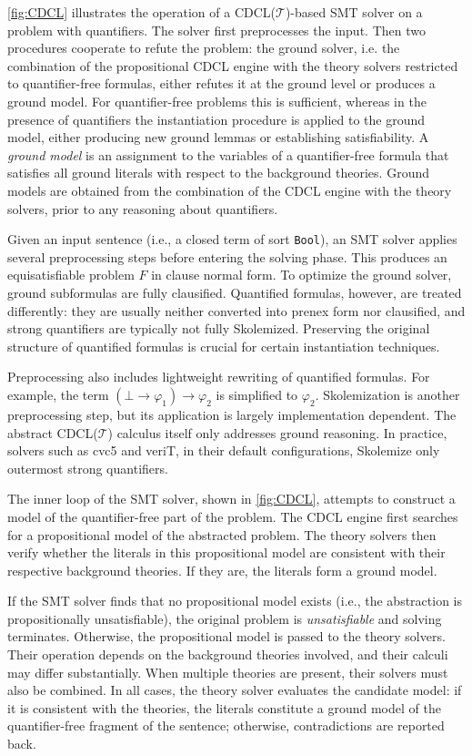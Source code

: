 \cref{fig:CDCL} illustrates the operation of a CDCL($\mathcal{T}$)-based SMT solver on a problem with quantifiers.
The solver first preprocesses the input.
Then two procedures cooperate to refute the problem: the ground solver, i.e. the combination of the propositional CDCL engine with the theory solvers restricted to quantifier-free formulas, either refutes it at the ground level or produces a ground model.
For quantifier-free problems this is sufficient, whereas in the presence of quantifiers the instantiation procedure is applied to the ground model, either producing new ground lemmas or establishing satisfiability.
A \emph{ground model} is an assignment to the variables of a quantifier-free formula that satisfies all ground literals with respect to the background theories.
Ground models are obtained from the combination of the CDCL engine with the theory solvers, prior to any reasoning about quantifiers.

Given an input sentence (i.e., a closed term of sort \texttt{Bool}), an SMT solver applies several preprocessing steps before entering the solving phase.
This produces an equisatisfiable problem $F$ in clause normal form.
To optimize the ground solver, ground subformulas are fully clausified.
Quantified formulas, however, are treated differently: they are usually neither converted into prenex form nor clausified, and strong quantifiers \cite{BAAZ2001273} are typically not fully Skolemized.
Preserving the original structure of quantified formulas is crucial for certain instantiation techniques.


Preprocessing also includes lightweight rewriting of quantified formulas.
For example, the term $(\bot \to \varphi_1) \to \varphi_2$ is simplified to $\varphi_2$.
Skolemization is another preprocessing step, but its application is largely implementation dependent.
The abstract CDCL($\mathcal{T}$) calculus itself only addresses ground reasoning.
In practice, solvers such as cvc5 and veriT, in their default configurations, Skolemize only outermost strong quantifiers.


The inner loop of the SMT solver, shown in \cref{fig:CDCL}, attempts to construct a model of the quantifier-free part of the problem.
The CDCL engine first searches for a propositional model of the abstracted problem.
The theory solvers then verify whether the literals in this propositional model are consistent with their respective background theories.
If they are, the literals form a ground model.


If the SMT solver finds that no propositional model exists (i.e., the abstraction is propositionally unsatisfiable), the original problem is \emph{unsatisfiable} and solving terminates.
Otherwise, the propositional model is passed to the theory solvers.
Their operation depends on the background theories involved, and their calculi may differ substantially.
When multiple theories are present, their solvers must also be combined.
In all cases, the theory solver evaluates the candidate model: if it is consistent with the theories, the literals constitute a ground model of the quantifier-free fragment of the sentence; otherwise, contradictions are reported back.

